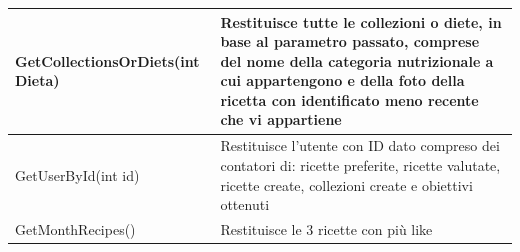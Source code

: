 ﻿\documentclass[a4paper,12pt]{report}
\begin{document}
\begin{table}[h!]
\begin{tabular}{ |p{3in}|p{2in}| }
        \hline
        \scriptsize{GetCollectionsOrDiets(int Dieta)} & \scriptsize{Restituisce tutte le collezioni o diete, in base al parametro passato, comprese del nome della categoria nutrizionale a cui appartengono e della foto della ricetta con identificato meno recente che vi appartiene} \\
        \hline
        \scriptsize{GetUserById(int id)} & \scriptsize{Restituisce l'utente con ID dato compreso dei contatori di: ricette preferite, ricette valutate, ricette create, collezioni create e obiettivi ottenuti} \\
        \hline
        \scriptsize{GetMonthRecipes()} & \scriptsize{Restituisce le 3 ricette con più like} \\
        \hline
    \end{tabular}
\end{table}
\end{document}
